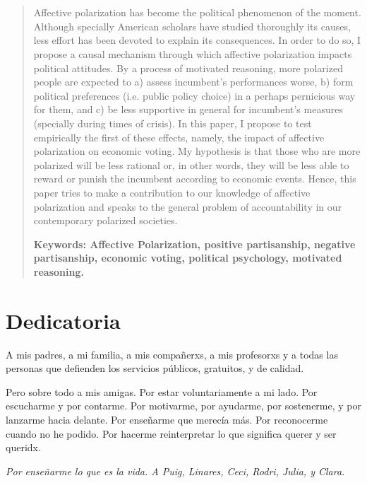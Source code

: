 \documentclass[a4paper, svgnames]{article}
\begin{document}
\thispagestyle{empty}%
\mbox{ }
\newpage

\thispagestyle{empty}%
\mbox{ }
\newpage

\begin{abstract}
	\setcounter{page}{3}
	Affective polarization has become the political phenomenon of the moment. Although specially American scholars have studied thoroughly its causes, less effort has been devoted to explain its consequences. In order to do so, I propose a causal mechanism through which affective polarization impacts political attitudes. By a process of motivated reasoning, more polarized people are expected to a) assess incumbent's performances worse, b) form political preferences (i.e. public policy choice) in a perhaps pernicious way for them, and c) be less supportive in general for incumbent's measures (specially during times of crisis). In this paper, I propose to test empirically the first of these effects, namely, the impact of affective polarization on economic voting. My hypothesis is that those who are more polarized will be less rational or, in other words, they will be less able to reward or punish the incumbent according to economic events. Hence, this paper tries to make a contribution to our knowledge of affective polarization and speaks to the general problem of accountability in our contemporary polarized societies.

	\textbf{Keywords: Affective Polarization, positive partisanship, negative partisanship, economic voting, political psychology, motivated reasoning.}
	\vfill
\end{abstract}
\newpage %
\thispagestyle{empty}
\mbox{}
\newpage

\section*{Dedicatoria}
\setcounter{page}{5}

A mis padres, a mi familia, a mis compañerxs, a mis profesorxs y a todas las personas que defienden los servicios públicos, gratuitos, y de calidad.

Pero sobre todo a mis amigas. Por estar voluntariamente a mi lado. Por escucharme y por contarme. Por motivarme, por ayudarme, por sostenerme, y por lanzarme hacia delante. Por enseñarme que merecía más. Por reconocerme cuando no he podido. Por hacerme reinterpretar lo que significa querer y ser queridx.

\textit{Por enseñarme lo que es la vida. A Puig, Linares, Ceci, Rodri, Julia, y Clara.}
\end{document}
